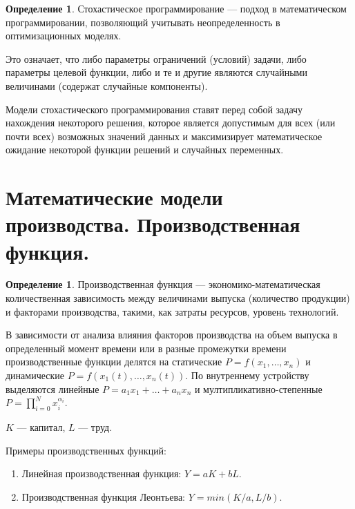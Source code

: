 \documentclass[12pt]{report}
\theoremstyle{definition}
\newtheorem{definition}[theorem]{Определение}
\begin{document}
\begin{definition}
Стохастическое программирование --- подход в математическом программировании,
позволяющий учитывать неопределенность в оптимизационных моделях.
\end{definition}

Это означает, что либо параметры ограничений (условий) задачи,
либо параметры целевой функции, либо и те и другие являются
случайными величинами (содержат случайные компоненты).

Модели стохастического программирования ставят перед собой задачу нахождения
некоторого решения, которое является допустимым для всех (или почти всех)
возможных значений данных и максимизирует математическое ожидание некоторой
функции решений и случайных переменных.


\section
{
  Математические модели производства.
  Производственная функция.
}

\begin{definition}
Производственная функция --- экономико-математическая количественная зависимость
между величинами выпуска (количество продукции) и факторами производства, такими,
как затраты ресурсов, уровень технологий.
\end{definition}

В зависимости от анализа влияния факторов производства на объем выпуска в
определенный момент времени или в разные промежутки времени производственные
функции делятся на статические $P = f(x_1, \dots, x_n)$ и динамические
$P = f(x_1(t), \dots, x_n(t))$. По внутреннему устройству выделяются линейные
$P = a_1 x_1 + \dots + a_n x_n$ и мултипликативно-степенные $P = \prod\limits_{i = 0}^N x^{\alpha_i}_i$.


$K$ --- капитал, $L$ --- труд.

Примеры производственных функций:

\begin{enumerate}
\item Линейная производственная функция: $Y = aK + bL$.
\item Производственная функция Леонтьева: $Y = min(K/a, L/b)$.
\end{enumerate}
\end{document}
